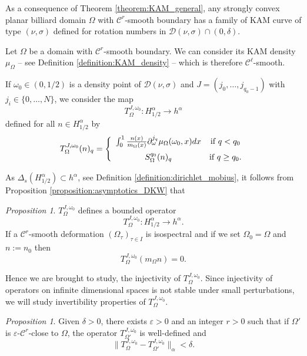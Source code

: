 \documentclass[12pt, openany]{amsart}
\theoremstyle{definition}
\theoremstyle{remark}
\theoremstyle{remark}
\theoremstyle{theorem}
\theoremstyle{theorem}
\theoremstyle{theorem}
\newtheorem{proposition}[theorem]{Proposition}
\theoremstyle{theorem}
\begin{document}
As a consequence of Theorem \ref{theorem:KAM_general}, any
strongly convex planar billiard domain $\Omega$ with $\mathscr C^r$-smooth boundary has a family of KAM curve of type $(\nu,\sigma)$ defined for rotation numbers in $\mathcal D(\nu,\sigma)\cap (0,\delta)$.

Let $\Omega$ be a domain with $\mathscr C^r$-smooth boundary. We can consider its KAM density $\mu_{\Omega}$ -- see Definition \ref{definition:KAM_density} -- which is therefore $\mathscr C^{\ell}$-smooth.

If $\omega_0\in(0,1/2)$ is a density point of $\mathcal D(\nu,\sigma)$ and $J=(j_0,\ldots,j_{q_0-1})$ with $j_i \in\{0,\ldots,N\}$, we consider the map
\[
T_{\Omega}^{J,\omega_0}: H^{\alpha}_{1/2} \to h^{\alpha}
\]
defined for all $n\in H^{\alpha}_{1/2}$ by
\begin{equation}
T_{\Omega}^{J,\omega_0}(n)_q = \left\{
\begin{array}{cc}\vspace*{0.2cm}
\int_0^{1} \frac{n(x)}{m_{\Omega}(x)}\partial_{\omega}^{j_q}\mu_{\Omega}(\omega_0,x)dx & \text{if }q<q_0\\
S_{\Omega}^{q_0}(n)_q & \text{if }q\geq q_0.
\end{array}
\right.
\end{equation}


As $\Delta_s(H^{\alpha}_{1/2})\subset h^{\alpha}$, see Definition \ref{definition:dirichlet_mobius}, it follows from Proposition \ref{proposition:asymptotics_DKW} that



\begin{proposition}
\label{proposition:operators_isospectral_deformations}
$T_{\Omega}^{J,\omega_0}$ defines a bounded operator 
\[
T_{\Omega}^{J,\omega_0}:H^{\alpha}_{1/2} \to h^{\alpha}.
\]
If a $\mathscr C^r$-smooth deformation $(\Omega_{\tau})_{\tau\in I}$ is isospectral and if we set $\Omega_0=\Omega$ and $n := n_0$ then
\[
T_{\Omega}^{J,\omega_0}(m_{\Omega} n) = 0.
\]
\end{proposition}

Hence we are brought to study, the injectivity of $T_{\Omega}^{J,\omega_0}$. Since injectivity of operators on infinite dimensional spaces is not stable under small perturbations, we will study invertibility properties of $T_{\Omega}^{J,\omega_0}$.

\begin{proposition}
\label{proposition:operators_continuity}
Given $\delta>0$, there exists $\varepsilon>0$ and an integer $r>0$ such that if $\Omega'$ is $\varepsilon$-$\mathscr C^r$-close to $\Omega$, the operator $T_{\Omega'}^{J,\omega_0}$ is well-defined and
\[
\|T_{\Omega}^{J,\omega_0}-T_{\Omega'}^{J,\omega_0}\|_{\alpha}<\delta.
\] 
\end{proposition}
\end{document}
